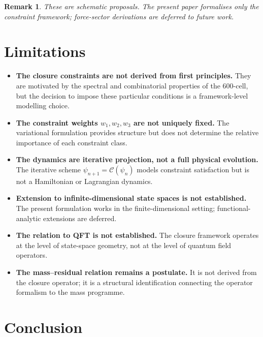 \documentclass[12pt]{article}
\newtheorem{remark}[theorem]{Remark}
\newcommand{\Ccal}{\mathcal{C}}
\begin{document}
\begin{remark}
These are schematic proposals. The present paper formalises only the constraint framework; force-sector derivations are deferred to future work.
\end{remark}

\section{Limitations}\label{sec:limits}

\begin{itemize}
    \item \textbf{The closure constraints are not derived from first principles.} They are motivated by the spectral and combinatorial properties of the 600-cell, but the decision to impose these particular conditions is a framework-level modelling choice.
    \item \textbf{The constraint weights $w_1, w_2, w_3$ are not uniquely fixed.} The variational formulation provides structure but does not determine the relative importance of each constraint class.
    \item \textbf{The dynamics are iterative projection, not a full physical evolution.} The iterative scheme $\psi_{n+1} = \Ccal(\psi_n)$ models constraint satisfaction but is not a Hamiltonian or Lagrangian dynamics.
    \item \textbf{Extension to infinite-dimensional state spaces is not established.} The present formulation works in the finite-dimensional setting; functional-analytic extensions are deferred.
    \item \textbf{The relation to QFT is not established.} The closure framework operates at the level of state-space geometry, not at the level of quantum field operators.
    \item \textbf{The mass--residual relation remains a postulate.} It is not derived from the closure operator; it is a structural identification connecting the operator formalism to the mass programme.
\end{itemize}

\section{Conclusion}\label{sec:conclusion}
\end{document}
